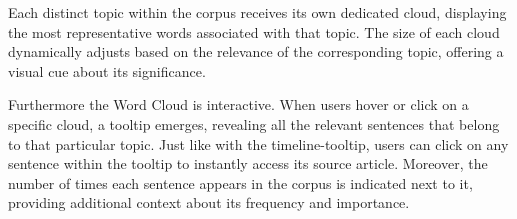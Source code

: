 \documentclass[a4paper,10pt]{report} %
\begin{document}
Each distinct topic within the corpus receives its own dedicated cloud, displaying the most representative words associated with that topic. The size of each cloud dynamically adjusts based on the relevance of the corresponding topic, offering a visual cue about its significance.

Furthermore the Word Cloud is interactive. When users hover or click on a specific cloud, a tooltip emerges, revealing all the relevant sentences that belong to that particular topic. Just like with the timeline-tooltip, users can click on any sentence within the tooltip to instantly access its source article. Moreover, the number of times each sentence appears in the corpus is indicated next to it, providing additional context about its frequency and importance.







\end{document}
